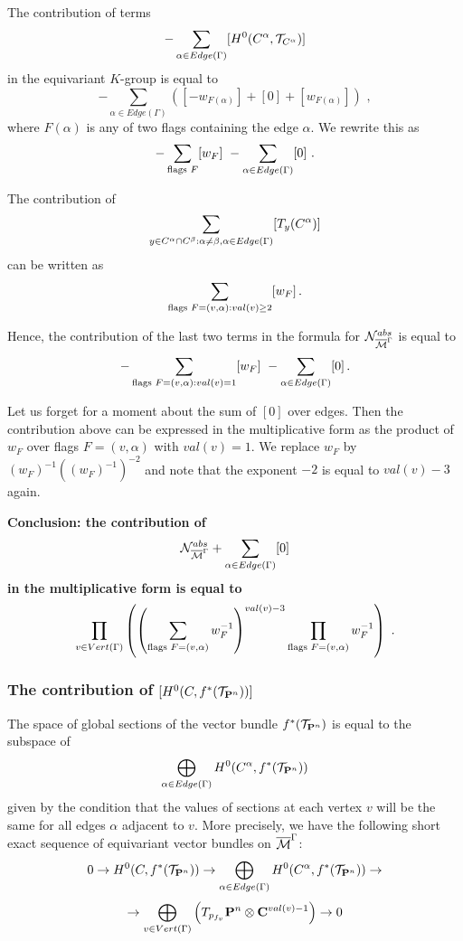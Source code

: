 \documentclass{amsart}
\begin{document}
The contribution of terms
$$-
\sum_{\alpha\in Edge(\Gamma)} [H^0(C^{\alpha}, \mathcal T_{C^{\alpha}})]$$
 in the equivariant $K$-group is equal to $$-
\sum_{\alpha\in Edge(\Gamma)}\left([-w_{F(\alpha)}]+[0]+
[w_{F(\alpha)}]\right)\,\,,$$
where $F(\alpha)$ is any of two flags containing the edge $\alpha$.
 We rewrite this as
$$\displaystyle-\sum_{\text{flags }F}[w_F]\,\,-\sum_{\alpha\in Edge(\Gamma)
} [0]\,\,.$$


The contribution of
$$\displaystyle\sum_{y\in C^{\alpha}\cap C^{\beta}: \alpha\ne\beta,
\alpha\in Edge(\Gamma)} [T_y(C^\alpha)]$$
can be written as
$$\displaystyle\sum_{\text{flags }F=(v,\alpha):val(v)\ge 2} [w_F]\,.$$

Hence, the contribution of the last two terms in the formula for
$\mathcal N^{abs}_{\overline{\mathcal{M}}^{\Gamma}}$ is equal to
$$\displaystyle-\sum_{
\text{flags }F=(v,\alpha):val(v)=1} [w_F]\,\,-\sum_{\alpha\in
Edge(\Gamma)}[0]\,.$$

Let us forget for a moment about the sum of $[0]$ over edges.
Then the contribution above can be expressed in the multiplicative form as the
product of $w_F$ over flags $F=(v,\alpha)$ with $val(v)=1$. We replace $w_F$ by
$(w_F)^{-1}\left((w_F)^{-1}
\right)^{-2}$ and note that the exponent $-2$ is equal to $val(v)-3$ again.

\bf Conclusion: \rm the contribution of
$$\mathcal N^{abs}_{\overline{\mathcal{M}}^{\Gamma}}+\displaystyle\sum_{\alpha\in Edge(\Gamma)}[0]$$
 in the multiplicative form is equal to
$$\displaystyle\prod_{v\in Vert(\Gamma)}\left(\left(\sum_
{\text{flags }F=(v,\alpha)} w_F^{-1}\right)^{val(v)-3}
\prod_{\text{flags }F=(v,\alpha)}
w_F^{-1}\right)\,\,.$$


\subsubsection{The contribution of $[H^0(C,f^*(\mathcal T_{\mathbf P^n}))]$}

  The space of global sections of the vector bundle $f^*(\mathcal T_{\mathbf P^n})$ is
equal to the subspace of
$$\displaystyle\bigoplus_{\alpha\in Edge(\Gamma)}H^0(C^{\alpha},f^*(\mathcal T_{\mathbf P^n}))$$
given by the condition that the values of sections at each vertex $v$  will be
the same for all edges $\alpha$ adjacent to $v$. More precisely,
 we have the following short exact sequence of equivariant vector bundles on
$\overline{\mathcal{M}}^{\Gamma}$:
$$0\to H^0(C,f^*(\mathcal T_{\mathbf P^n}))\to\displaystyle\bigoplus_{\alpha\in
Edge(\Gamma)}H^0(C^{\alpha},f^*(\mathcal T_{\mathbf P^n}))\to
$$
$$\to\bigoplus_{v\in Vert (\Gamma)}
\left(T_{p_{f_v}}\mathbf P^n\otimes\mathbf C^{val(v)-1}\right)\to0$$
\end{document}
